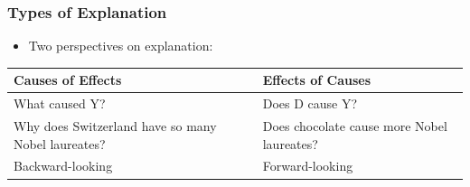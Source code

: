 \documentclass[xcolor=x11names,compress]{beamer}\usepackage[]{graphicx}\usepackage[]{xcolor}
\renewcommand{\(}{\begin{columns}}
\renewcommand{\)}{\end{columns}}
\newcommand{\<}[1]{\begin{column}{#1}}
\renewcommand{\>}{\end{column}}
\begin{document}
\begin{frame}
\frametitle{Types of Explanation}
\begin{itemize}
\item Two perspectives on explanation:
\end{itemize}
\pause
\begin{table}[htbp]
  \centering
    \begin{tabular}{|>{\raggedright}p{5cm}|p{5cm}|}
    \toprule
    \textbf{Causes of Effects} & \textbf{Effects of Causes} \\
    \midrule
    What caused Y? & Does D cause Y? \\
    \midrule
    Why does Switzerland have so many Nobel laureates? & Does chocolate cause more Nobel laureates? \\
    \midrule
    Backward-looking & Forward-looking \\
    \bottomrule
    \end{tabular}%
  \label{tab:addlabel}%
\end{table}%
\end{frame}
\end{document}
